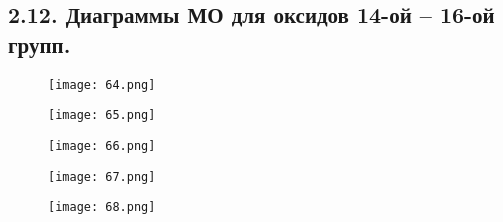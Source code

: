 

\subsection{2.12. Диаграммы МО для оксидов 14-ой – 16-ой групп.} 

\par\bigskip

\begin{figure}[H]
	\centering
	{\texttt{[image: 64.png]}}
\end{figure}

\begin{figure}[H]
	\centering
	{\texttt{[image: 65.png]}}
\end{figure}

\begin{figure}[H]
	\centering
	{\texttt{[image: 66.png]}}
\end{figure}

\begin{figure}[H]
	\centering
	{\texttt{[image: 67.png]}}
\end{figure}

\begin{figure}[H]
	\centering
	{\texttt{[image: 68.png]}}
\end{figure}

\par\bigskip
\par\bigskip